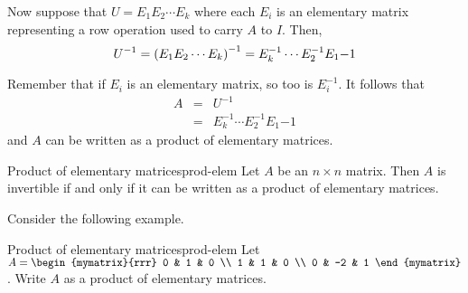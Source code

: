 Now suppose that $U = E_1 E_2 \cdots E_k$ where each $E_i$ is an elementary matrix representing a row operation used to carry $A$ to $I$. Then, 
\[
U^{-1} = \left(E_1 E_2 \cdots E_k \right) ^{-1}  =  E_k^{-1} \cdots E_2^{-1} E_1{-1} 
\]

Remember that if $E_i$ is an elementary matrix, so too is $E_i^{-1}$. 
It follows that 
\begin{eqnarray*}
A&=& U^{-1} \\
&=&  E_k^{-1} \cdots E_2^{-1} E_1{-1}
\end{eqnarray*}
and $A$ can be written as a product of elementary matrices. 

\begin{theorem}{Product of elementary matrices}{prod-elem}
Let $A$ be an $n \times n$ matrix. Then $A$ is invertible if and only if it can be written as a product of elementary matrices.
\end{theorem}

Consider the following example.

\begin{example}{Product of elementary matrices}{prod-elem}
Let $A = \begin{mymatrix}{rrr}
0 & 1 & 0 \\
1 & 1 & 0 \\
0 & -2 & 1 
\end{mymatrix}$. 
Write $A$ as a product of elementary matrices. 
\end{example}

